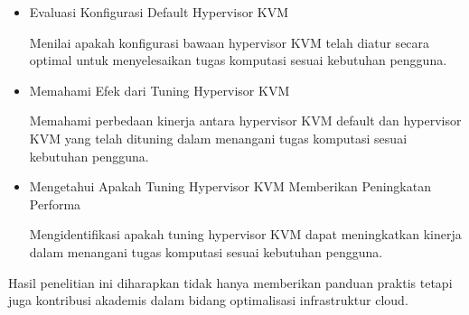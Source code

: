 \begin{itemize}
      \item Evaluasi Konfigurasi Default Hypervisor KVM
      
      Menilai apakah konfigurasi bawaan hypervisor KVM telah diatur secara optimal untuk menyelesaikan tugas komputasi sesuai kebutuhan pengguna.

      \item Memahami Efek dari Tuning Hypervisor KVM

      Memahami perbedaan kinerja antara hypervisor KVM default dan hypervisor KVM yang telah dituning dalam menangani tugas komputasi sesuai kebutuhan pengguna.

      \item Mengetahui Apakah Tuning Hypervisor KVM Memberikan Peningkatan Performa

      Mengidentifikasi apakah tuning hypervisor KVM dapat meningkatkan kinerja dalam menangani tugas komputasi sesuai kebutuhan pengguna.
\end{itemize}

Hasil penelitian ini diharapkan tidak hanya memberikan panduan praktis tetapi juga kontribusi akademis dalam bidang optimalisasi infrastruktur cloud.


